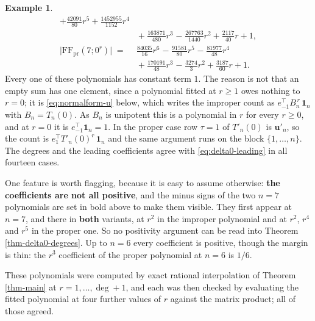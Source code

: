 \documentclass[11pt, a4paper, abstract=yes]{scrartcl}
\theoremstyle{definition}
\newtheorem{mexample}[definition]{Example}
\theoremstyle{remark}
\theoremstyle{plain}
\newcommand{\vek}[1]{\boldsymbol{#1}}
\begin{document}
\begin{mexample}
\begin{align*}
    +\tfrac{42091}{80}r^{5}+\tfrac{1452955}{1152}r^{4}\\
  &{}+\tfrac{163871}{480}r^{3}\;\boldsymbol{-}\;\tfrac{267763}{1440}r^{2}
    +\tfrac{2117}{40}r+1 ,\\[0.6ex]
  \lvert\mathrm{FF}_{\mathrm{pr}}(7;0^r)\rvert\;=\;&
    \tfrac{84035}{16}r^{6}\;\boldsymbol{-}\;\tfrac{91581}{80}r^{5}
    \;\boldsymbol{-}\;\tfrac{81977}{48}r^{4}\\
  &{}+\tfrac{170191}{48}r^{3}\;\boldsymbol{-}\;\tfrac{3274}{3}r^{2}
    +\tfrac{3187}{60}r+1 .
\end{align*}
Every one of these polynomials has constant term \(1\). The reason is not that an empty sum has
one element, since a polynomial fitted at \(r\ge1\) owes nothing to \(r=0\); it is
\eqref{eq:normalform-u} below, which writes the improper count as
\(e_{-1}^{\!\top}B_n^{\,r}\,\vek1_n\) with \(B_n=T_n(0)\). As \(B_n\) is unipotent this is a
polynomial in \(r\) for every \(r\ge0\), and at \(r=0\) it is \(e_{-1}^{\!\top}\vek1_n=1\). In the
proper case row \(\tau=1\) of \(T'_n(0)\) is \(\vek u'_n\), so the count is
\(e_1^{\!\top}T'_n(0)^{r}\,\vek1_n\) and the same argument runs on the block
\(\lbrace1,\dots,n\rbrace\). The degrees and the leading coefficients agree with
\eqref{eq:delta0-leading} in all fourteen cases.

One feature is worth flagging, because it is easy to assume otherwise: \textbf{the coefficients are not all
positive}, and the minus signs of the two \(n=7\) polynomials are set in bold above to make them
visible. They first appear at \(n=7\), and there in
\textbf{both} variants, at \(r^2\) in the improper polynomial and at \(r^2\), \(r^4\) and \(r^5\) in the
proper one. So no positivity argument can be read into Theorem \ref{thm-delta0-degrees}. Up to \(n=6\)
every coefficient is positive, though the margin is thin: the \(r^3\) coefficient of the proper
polynomial at \(n=6\) is \(1/6\).

These polynomials were computed by exact rational interpolation of Theorem \ref{thm-main} at
\(r=1,\dots,\deg+1\), and each was then checked by evaluating the fitted polynomial at four further
values of \(r\) against the matrix product; all of those agreed.
\label{tab-delta0-polys}
\end{mexample}
\end{document}
